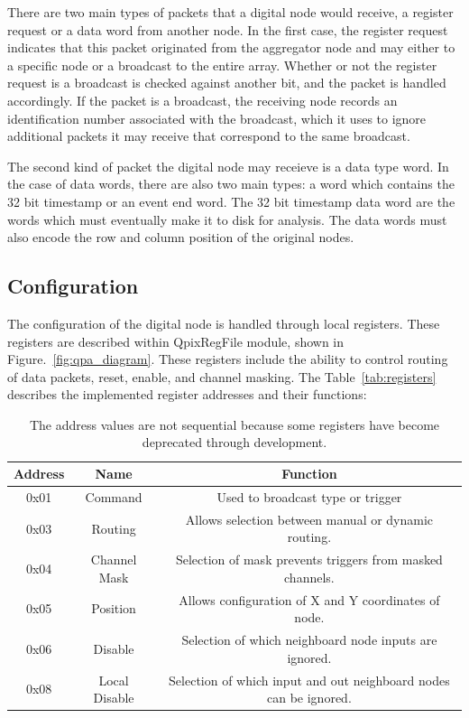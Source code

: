 There are two main types of packets that a digital node would receive, a register request or a data word from another node.
In the first case, the register request indicates that this packet originated from the aggregator node and may either to a specific node or a broadcast to the entire array.
Whether or not the register request is a broadcast is checked against another bit, and the packet is handled accordingly.
If the packet is a broadcast, the receiving node records an identification number associated with the broadcast, which it uses to ignore additional packets it may receive that correspond to the same broadcast.

The second kind of packet the digital node may receieve is a data type word.
In the case of data words, there are also two main types: a word which contains the 32 bit timestamp or an event end word.
The 32 bit timestamp data word are the words which must eventually make it to disk for analysis.
The data words must also encode the row and column position of the original nodes.

\subsection{Configuration}

The configuration of the digital node is handled through local registers.
These registers are described within QpixRegFile module, shown in Figure.~\ref{fig:qpa_diagram}.
These registers include the ability to control routing of data packets, reset, enable, and channel masking.
The Table~\ref{tab:registers} describes the implemented register addresses and their functions:

\begin{table}
\begin{center}
\begin{tabular}{||c c c||}
 \hline
 Address & Name & Function \\ [0.5ex]
 \hline\hline
  0x01 & Command & Used to broadcast type or trigger \\
 \hline
  0x03 & Routing & Allows selection between manual or dynamic routing. \\
 \hline
  0x04 & Channel Mask & Selection of mask prevents triggers from masked channels. \\
 \hline
  0x05 & Position & Allows configuration of X and Y coordinates of node. \\
 \hline
  0x06 & Disable & Selection of which neighboard node inputs are ignored. \\
 \hline
  0x08 & Local Disable & Selection of which input and out neighboard nodes can be ignored. \\
 \hline
\end{tabular}
\caption{The address values are not sequential because some registers have become deprecated through development.}
\end{center}
\end{table}
~\label{table:node_registers}

